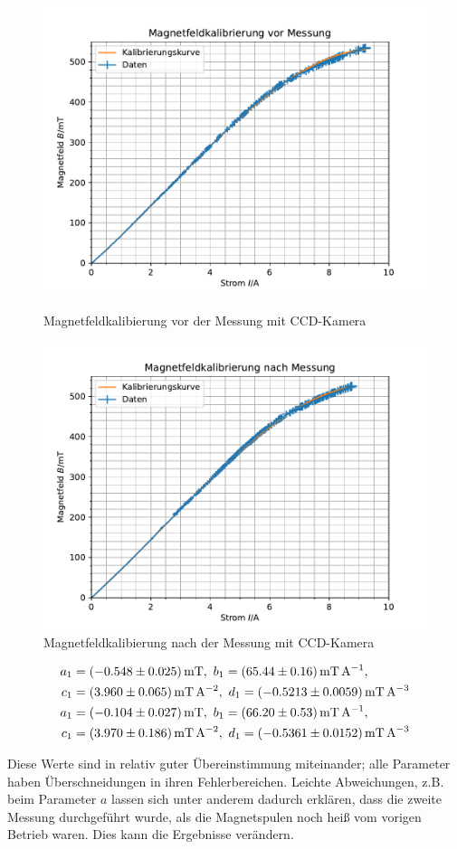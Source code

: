 \documentclass{article}
\begin{document}
\begin{multicols}{2}
\begin{figure}[H]
  \centering
  \includegraphics[width=.8\linewidth]{magnetkalib}
  \caption{Magnetfeldkalibierung vor der Messung mit CCD-Kamera}
  \includegraphics[width=.8\linewidth]{magnetkalib2}
  \caption{Magnetfeldkalibierung nach der Messung mit CCD-Kamera}
  \label{fig:magnetkalib}
\end{figure}

\begin{align*}
  a_1&=\SI{-0.548 \pm 0.025}{\mT},\ b_1=\SI{65.44 \pm 0.16}{\mT\per\A}, \\
  c_1&=\SI{3.96 \pm 0.065}{\mT\per\A\squared},\ d_1=\SI{-0.5213 \pm 0.0059}{\mT\per\A\cubed} \\
  a_1&=\SI{-0.104 \pm 0.027}{\mT},\ b_1=\SI{66.20 \pm 0.53}{\mT\per\A}, \\
  c_1&=\SI{3.97 \pm 0.186}{\mT\per\A\squared},\ d_1=\SI{-0.5361 \pm 0.0152}{\mT\per\A\cubed}
\end{align*}

Diese Werte sind in relativ guter Übereinstimmung miteinander; alle Parameter haben Überschneidungen in ihren Fehlerbereichen.
Leichte Abweichungen, z.B. beim Parameter $a$ lassen sich unter anderem dadurch erklären, dass die zweite Messung durchgeführt wurde,
als die Magnetspulen noch heiß vom vorigen Betrieb waren. Dies kann die Ergebnisse verändern.


\end{multicols}
\end{document}
